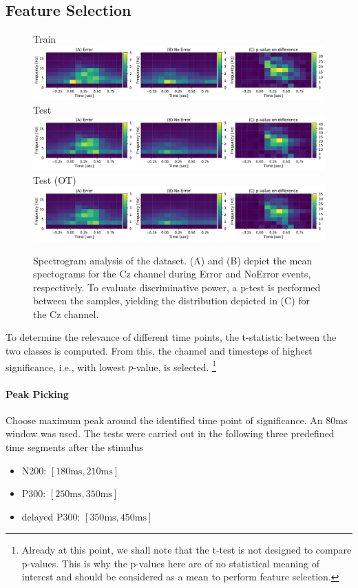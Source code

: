 \documentclass[10pt,a4paper]{article}
\begin{document}
\subsection{Feature Selection}

\begin{figure}[htp]
    \small Train\\
    \includegraphics[width=\textwidth]{fig/spectrogram-train}
    \small Test\\
    \includegraphics[width=\textwidth]{fig/spectrogram-test}
    \small Test (OT)\\
    \includegraphics[width=\textwidth]{fig/spectrogram-ot}
    \caption{Spectrogram analysis of the dataset. (A) and (B) depict the mean spectograms for the Cz channel during Error and NoError events, respectively. To evaluate discriminative power, a p-test is performed between the samples, yielding the distribution depicted in (C) for the Cz channel.}
    \label{fig:spectrogram}
\end{figure}

To determine the relevance of different time points, the t-statistic between the two classes is computed.
From this, the channel and timesteps of highest significance, i.e., with lowest $p$-value, is selected.
\footnote{Already at this point, we shall note that the t-test is not designed to compare p-values.
This is why the p-values here are of no statistical meaning of interest and should be considered as a mean to perform feature selection.}

\paragraph{Peak Picking} Choose maximum peak around the identified time point of significance. An 80ms window was used.
The tests were carried out in the following three predefined time segments after the stimulus
\begin{itemize}
    \item N200: $[180\text{ms},210\text{ms}]$
    \item P300: $[250\text{ms},350\text{ms}]$
    \item delayed P300: $[350\text{ms},450\text{ms}]$
\end{itemize}
\end{document}
